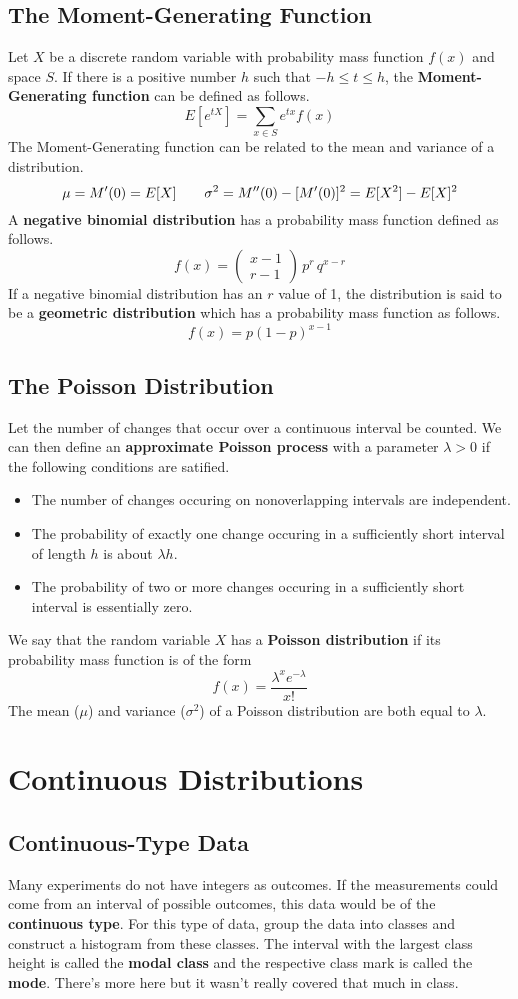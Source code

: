 \documentclass{article}
\begin{document}
\subsection{The Moment-Generating Function}
Let \(X\) be a discrete random variable with probability mass function \(f(x)\) and space \(S\). If there is a positive number \(h\) such that \(-h \leq t \leq h\), the \textbf{Moment-Generating function} can be defined as follows.
\[E[e^{tX}]=\sum\limits_{x\in S}e^{tx}f(x)\]
The Moment-Generating function can be related to the mean and variance of a distribution.
\[\mu=M'(0)=E[X]\hspace{7 mm}\sigma^2=M''(0)-[M'(0)]^2=E[X^2]-E[X]^2\]
A \textbf{negative binomial distribution} has a probability mass function defined as follows.
\[f(x)=\left(\begin{matrix}x-1\\r-1\end{matrix}\right)\,p^r\,q^{x-r}\]
If a negative binomial distribution has an \(r\) value of 1, the distribution is said to be a \textbf{geometric distribution} which has a probability mass function as follows.
\[f(x)=p(1-p)^{x-1}\]
\subsection{The Poisson Distribution}
Let the number of changes that occur over a continuous interval be counted. We can then define an \textbf{approximate Poisson process} with a parameter \(\lambda>0\) if the following conditions are satified.
\begin{itemize}
    \item The number of changes occuring on nonoverlapping intervals are independent.
    \item The probability of exactly one change occuring in a sufficiently short interval of length \(h\) is about \(\lambda h\).
    \item The probability of two or more changes occuring in a sufficiently short interval is essentially zero.
\end{itemize}
We say that the random variable \(X\) has a \textbf{Poisson distribution} if its probability mass function is of the form
\[f(x)=\frac{\lambda^xe^{-\lambda}}{x!}\]
The mean (\(\mu\)) and variance (\(\sigma^2\)) of a Poisson distribution are both equal to \(\lambda\).
\section{Continuous Distributions}
\subsection{Continuous-Type Data}
Many experiments do not have integers as outcomes. If the measurements could come from an interval of possible outcomes, this data would be of the \textbf{continuous type}. For this type of data, group the data into classes and construct a histogram from these classes. The interval with the largest class height is called the \textbf{modal class} and the respective class mark is called the \textbf{mode}. There's more here but it wasn't really covered that much in class.
\end{document}
